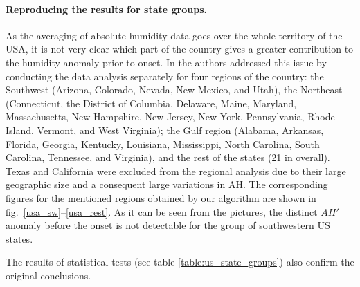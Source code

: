 \documentclass[procedia]{easychair}
\begin{document}
\paragraph{Reproducing the results for state groups.}
As the averaging of absolute humidity data goes over the whole territory of the USA, it is not very clear which part of the country gives a greater contribution to the humidity anomaly prior to onset. In \cite{shaman2010absolute} the authors addressed this issue by conducting the data analysis separately for four regions of the country: the Southwest (Arizona, Colorado, Nevada, New Mexico, and Utah), the Northeast (Connecticut, the District of Columbia, Delaware, Maine, Maryland, Massachusetts, New Hampshire, New Jersey, New York, Pennsylvania, Rhode Island, Vermont, and West Virginia); the Gulf region (Alabama, Arkansas, Florida, Georgia, Kentucky, Louisiana, Mississippi, North Carolina, South Carolina, Tennessee, and Virginia), and the rest of the states (21 in overall). Texas and California were excluded from the regional analysis due to their large geographic size and a consequent large variations in AH. The corresponding figures for the mentioned regions obtained by our algorithm are shown in fig.~\ref{usa_sw}--\ref{usa_rest}. As it can be seen from the pictures, the distinct $AH'$ anomaly before the onset is not detectable for the group of southwestern US states.

The results of statistical tests (see table \ref{table:us_state_groups}) also confirm the original conclusions.
\end{document}

